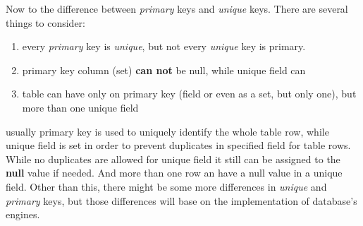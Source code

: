 \documentclass[a4paper,11pt]{article}
\begin{document}
\begin{enumerate}
		Now to the difference between \emph{primary} keys and \emph{unique} keys. There are several things to consider:
		\begin{enumerate}
			\item every \emph{primary} key is \emph{unique}, but not every \emph{unique} key is primary.
			\item primary key column (set) \textbf{can not} be null, while unique field can
			\item table can have only on primary key (field or even as a set, but only one), but more than one unique field
		\end{enumerate}

		usually primary key is used to uniquely identify the whole table row, while unique field is set in order to prevent duplicates in specified field for table rows. While no duplicates are allowed for unique field it still can be assigned to the \textbf{null} value if needed. And more than one row an have a null value in a unique field. Other than this, there might be some more differences in \emph{unique} and \emph{primary} keys, but those differences will base on the implementation of database's engines.
	\end{enumerate}

	
		
	
		
\end{document}
